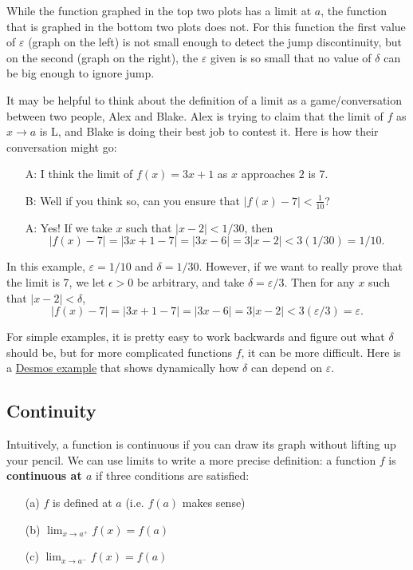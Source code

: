 While the function graphed in the top two plots has a limit at $a$, the function that is graphed in the bottom two plots does not. For this function the first value of $\varepsilon$ (graph on the left) is not small enough to detect the jump discontinuity, but on the second (graph on the right), the $\varepsilon$ given is so small that no value of $\delta$ can be big enough to ignore jump.

It may be helpful to think about the definition of a limit as a game/conversation between two people, Alex and Blake. Alex is trying to claim that the limit of $f$ as $x\to a$ is L, and Blake is doing their best job to contest it. Here is how their conversation might go:
\begin{itemize}
\item[A:] I think the limit of $f(x)=3x+1$ as $x$ approaches $2$ is 7.
\item[B:] Well if you think so, can you ensure that $|f(x)-7|<\frac{1}{10}$?
\item[A:] Yes! If we take $x$ such that $|x-2|<1/30$, then
$$|f(x)-7|=|3x + 1 - 7| = |3x-6| = 3|x-2| < 3(1/30) = 1/10.$$
\end{itemize}
In this example, $\varepsilon = 1/10$ and $\delta = 1/30$. However, if we want to really prove that the limit is 7, we let $\epsilon>0$ be arbitrary, and take $\delta = \varepsilon/3$. Then for any $x$ such that $|x-2|<\delta$,
$$|f(x)-7|=|3x + 1 - 7| = |3x-6| = 3|x-2| < 3(\varepsilon/3) = \varepsilon.$$


For simple examples, it is pretty easy to work backwards and figure out what $\delta$ should be, but for more complicated functions $f$, it can be more difficult. Here is a \href{https://www.desmos.com/calculator/cuoca85inx}{Desmos example} that shows dynamically how $\delta$ can depend on $\varepsilon$.


\subsection{Continuity}

Intuitively, a function is continuous if you can draw its graph without lifting up your pencil. We can use limits to write a more precise definition: a function $f$ is \textbf{continuous at $a$} if three conditions are satisfied:
\begin{enumerate}
\item[(a)] $f$ is defined at $a$ (i.e. $f(a)$ makes sense)
\item[(b)] $\displaystyle\lim_{x\to a^+} f(x)= f(a)$
\item[(c)] $\displaystyle\lim_{x\to a^-} f(x)= f(a)$
\end{enumerate}

